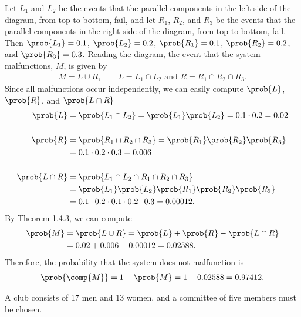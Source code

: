 \documentclass[11pt, newpage]{homework}
\begin{document}
Let \(L_1\) and \(L_2\) be the events that the parallel components in the left side of the diagram, from top to bottom, fail, and let \(R_1\), \(R_2\), and \(R_3\) be the events that the parallel components in the right side of the diagram, from top to bottom, fail. Then \(\prob{L_1} = 0.1\), \(\prob{L_2} = 0.2\), \(\prob{R_1} = 0.1\), \(\prob{R_2} = 0.2\), and \(\prob{R_3} = 0.3\). Reading the diagram, the event that the system malfunctions, \(M\), is given by
\begin{align*}
	M = L \cup R, \qquad L = L_1 \cap L_2 \text{ and } R = R_1 \cap R_2 \cap R_3.
\end{align*}
Since all malfunctions occur independently, we can easily compute \(\prob{L}\), \(\prob{R}\), and \(\prob{L \cap R}\)
\begin{align*}
	\prob{L} &= \prob{L_1 \cap L_2} = \prob{L_1}\prob{L_2} = 0.1\cdot0.2 = 0.02 \\
	\\
	\prob{R} &= \prob{R_1 \cap R_2 \cap R_3} = \prob{R_1}\prob{R_2}\prob{R_3}\\
	&= 0.1\cdot0.2\cdot0.3 = 0.006\\
	\\
	\prob{L \cap R} &= \prob{L_1 \cap L_2 \cap R_1 \cap R_2 \cap R_3}\\
	&= \prob{L_1}\prob{L_2}\prob{R_1}\prob{R_2}\prob{R_3}\\
	&= 0.1\cdot0.2\cdot0.1\cdot0.2\cdot0.3 = 0.00012.
\end{align*}
By Theorem 1.4.3, we can compute
\begin{align*}
	\prob{M} &= \prob{L\cup R} = \prob{L} + \prob{R} - \prob{L\cap R}\\
	&= 0.02 + 0.006 - 0.00012 = 0.02588.
\end{align*}
Therefore, the probability that the system does not malfunction is
\begin{align*}
	\prob{\comp{M}} = 1 - \prob{M} = 1 - 0.02588 = 0.97412.
\end{align*}

A club consists of 17 men and 13 women, and a committee of five members must be chosen.
\end{document}
